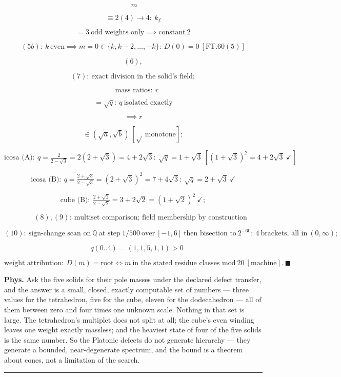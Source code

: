 \begin{theorem}
\[
\ m
\]

\[
\equiv 2(4)\to4:\ k_f
\]

\[
= 3\ \text{odd weights only}\implies\text{constant}\ 2
\]

\[
(5b):\ k\ \text{even}\implies m=0\in\{k,k{-}2,\dots,-k\}:\ D(0)=0\ [\mathrm{FT.60}(5)]
\]

\[
(6),
\]

\[
(7):\ \text{exact division in the solid's field};
\]

\[
\quad\text{mass ratios}:\ r
\]

\[
= \sqrt{q}:\ q\ \text{isolated exactly}
\]

\[
\implies r
\]

\[
\in (\sqrt a,\sqrt b)\ [\sqrt{}\ \text{monotone}];
\]

\[
\text{icosa (A)}:\ q=\tfrac{2}{2-\sqrt3}=2(2{+}\sqrt3)=4{+}2\sqrt3:\ \sqrt q=1{+}\sqrt3\ [(1{+}\sqrt3)^2=4{+}2\sqrt3\ \checkmark]
\]

\[
\text{icosa (B)}:\ q=\tfrac{2+\sqrt3}{2-\sqrt3}=(2{+}\sqrt3)^2=7{+}4\sqrt3:\ \sqrt q=2{+}\sqrt3\ \checkmark
\]

\[
\text{cube (B)}:\ \tfrac{2+\sqrt2}{2-\sqrt2}=3{+}2\sqrt2=(1{+}\sqrt2)^2\ \checkmark;
\]

\[
\qquad (8),(9):\ \text{multiset comparison; field membership by construction}
\]

\[
(10):\ \text{sign-change scan on}\ \mathbb Q\ \text{at step}\ 1/500\ \text{over}\ [-1,6]\ \text{then bisection to}\ 2^{-60}:\ 4\ \text{brackets, all in}\ (0,\infty);
\]

\[
\quad q(0..4)=(1,1,5,1,1)>0
\]

\[
\text{weight attribution}:\ D(m)=\text{root}\iff m\ \text{in the stated residue classes mod}\ 20\ [\text{machine}].\ \blacksquare
\]

\textbf{Phys.} Ask the five solids for their pole masses under the declared defect transfer, and the answer is a small, closed, exactly computable set of numbers — three values for the tetrahedron, five for the cube, eleven for the dodecahedron — all of them between zero and four times one unknown scale. Nothing in that set is large. The tetrahedron's multiplet does not split at all; the cube's even winding leaves one weight exactly massless; and the heaviest state of four of the five solids is the same number. So the Platonic defects do not generate hierarchy — they generate a bounded, near-degenerate spectrum, and the bound is a theorem about cones, not a limitation of the search.

\vspace{2pt}\noindent\rule{\textwidth}{0.4pt}\vspace{2pt}

\end{theorem}

